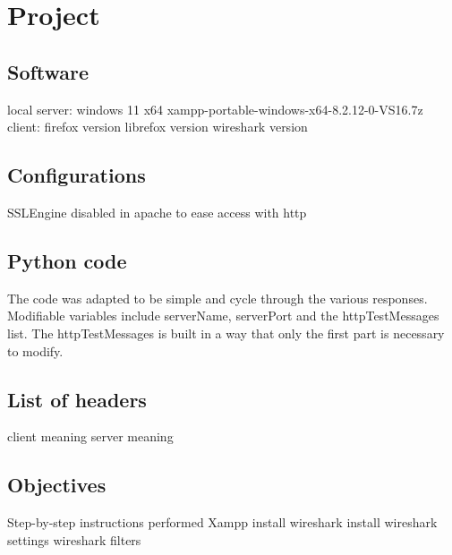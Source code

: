 \documentclass[11pt,a4paper]{report}
\begin{document}
\section{Project}
    \subsection{Software}
        local server:
            windows 11 x64
            xampp-portable-windows-x64-8.2.12-0-VS16.7z
        client:
            firefox version
            librefox version
            wireshark version
    
    \subsection{Configurations}
        SSLEngine disabled in apache to ease access with http
    
    \subsection{Python code}
        \lstset{style=pythoncode}
        
        The code was adapted to be simple and cycle through the various responses.
        Modifiable variables include serverName, serverPort and the httpTestMessages list.
        The httpTestMessages is built in a way that only the first part is necessary to modify.
    
    \subsection{List of headers}
        client
            meaning
        server
            meaning
    
    \subsection{Objectives}
        Step-by-step instructions performed
        Xampp install
        wireshark install
        wireshark settings
        wireshark filters
        
\end{document}

